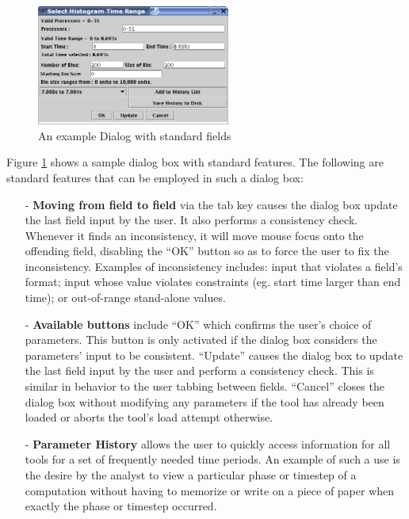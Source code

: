 \documentclass[10pt]{article}
\begin{document}
\begin{itemize}
\begin{figure}[htb]
\center
\includegraphics[width=2.5in]{fig/standard_dialog}
\caption{An example Dialog with standard fields}
\label{standard dialog}
\end{figure}

Figure \ref{standard dialog} shows a sample dialog box with standard
features. The following are standard features that can be employed in
such a dialog box:

\begin{itemize}
\item[-] {\bf Moving from field to field} via the tab key causes the
dialog box update the last field input by the user. It also performs a
consistency check. Whenever it finds an inconsistency, it will move
mouse focus onto the offending field, disabling the ``OK'' button so
as to force the user to fix the inconsistency. Examples of
inconsistency includes: input that violates a field's format; input
whose value violates constraints (eg. start time larger than end
time); or out-of-range stand-alone values.
\item[-] {\bf Available buttons} include ``OK'' which confirms the
user's choice of parameters. This button is only activated if the
dialog box considers the parameters' input to be
consistent. ``Update'' causes the dialog box to update the last field
input by the user and perform a consistency check. This is similar in
behavior to the user tabbing between fields. ``Cancel'' closes the
dialog box without modifying any parameters if the tool has already
been loaded or aborts the tool's load attempt otherwise.
\item[-] {\bf Parameter History} allows the user to quickly access
information for all tools for a set of frequently needed time
periods. An example of such a use is the desire by the analyst to view
a particular phase or timestep of a computation without having to
memorize or write on a piece of paper when exactly the phase or
timestep occurred.


\end{itemize}
\end{itemize}
\end{document}
